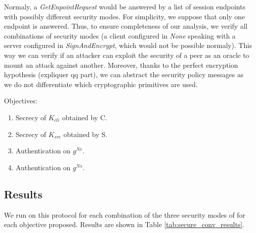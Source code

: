 Normaly, a {\em GetEnpointRequest} would be answered by a list of session
endpoints with possibly different security modes.
For simplicity, we suppose that only one endpoint is answered.
Thus, to ensure completeness of our analysis, we verify all combinations of
security modes (\eg a client configured in {\em None} speaking with a server
configured in {\em SignAndEncrypt}, which would not be possible normaly).
This way we can verify if an attacker can exploit the security of a peer as an
oracle to mount an attack against another.
Moreover, thanks to the perfect encryption hypothesis (\TODO expliquer qq part),
we can abstract the security policy messages as we do not differentiate which
cryptographic primitives are used.

Objectives:
\begin{enumerate}
    \item\label{item:sc_sec_cli} Secrecy of $K_{cli}$ obtained by C.
    \item\label{item:sc_sec_srv} Secrecy of $K_{src}$ obtained by S.
    \item\label{item:sc_auth_cli} Authentication on $g^{Nc}$.
    \item\label{item:sc_auth_srv} Authentication on $g^{Ns}$.
\end{enumerate}

\subsection{Results}

We run \proverif on this protocol for each combination of the three security
modes of \opcua for each objective proposed.
Results are shown in Table \ref{tab:secure_conv_results}.

